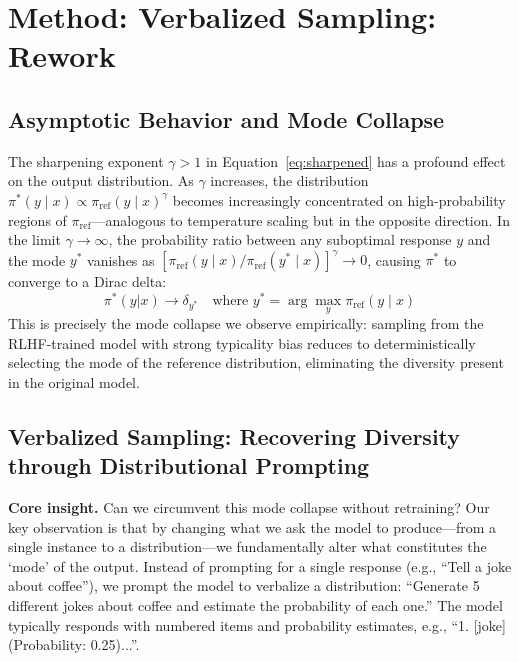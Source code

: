 \section{Method: Verbalized Sampling: Rework}

\subsection{Asymptotic Behavior and Mode Collapse}

The sharpening exponent $\gamma > 1$ in Equation~\eqref{eq:sharpened} has a profound effect on the output distribution. As $\gamma$ increases, the distribution $\pi^*(y \mid x) \propto \pi_\text{ref}(y \mid x)^\gamma$ becomes increasingly concentrated on high-probability regions of $\pi_\text{ref}$—analogous to temperature scaling but in the opposite direction. In the limit $\gamma \to \infty$, the probability ratio between any suboptimal response $y$ and the mode $y^*$ vanishes as $[\pi_\text{ref}(y \mid x) / \pi_\text{ref}(y^* \mid x)]^\gamma \to 0$, causing $\pi^*$ to converge to a Dirac delta:
\begin{equation}
\pi^*(y|x) \to \delta_{y^*} \quad \text{where } y^* = \arg\max_y \pi_\text{ref}(y \mid x)
\end{equation}
This is precisely the mode collapse we observe empirically: sampling from the RLHF-trained model with strong typicality bias reduces to deterministically selecting the mode of the reference distribution, eliminating the diversity present in the original model.

\subsection{Verbalized Sampling: Recovering Diversity through Distributional Prompting}

\textbf{Core insight.} Can we circumvent this mode collapse without retraining? Our key observation is that by changing what we ask the model to produce—from a single instance to a distribution—we fundamentally alter what constitutes the `mode' of the output. Instead of prompting for a single response (e.g., ``Tell a joke about coffee''), we prompt the model to verbalize a distribution: ``Generate 5 different jokes about coffee and estimate the probability of each one.'' The model typically responds with numbered items and probability estimates, e.g., ``1. [joke] (Probability: 0.25)...''.


